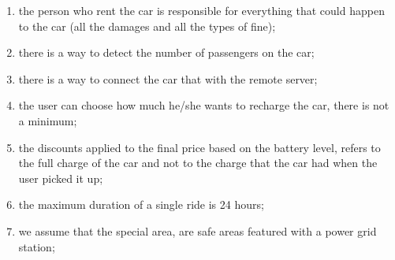 \begin{enumerate}
	\item the person who rent the car is responsible for everything that could happen to the car (all the damages and all the types of fine);
	\item there is a way to detect the number of passengers on the car;
	\item there is a way to connect the car  that with the remote server;
	\item the user can choose how much he/she wants to recharge the car, there is not a minimum;
	\item the discounts applied to the final price based on the battery level, refers to the full charge of the car and not to the charge that the car had when the user picked it up;
	\item the maximum duration of a single ride is 24 hours;
	\item we assume that the special area, are safe areas featured with a power grid station;
\end{enumerate}